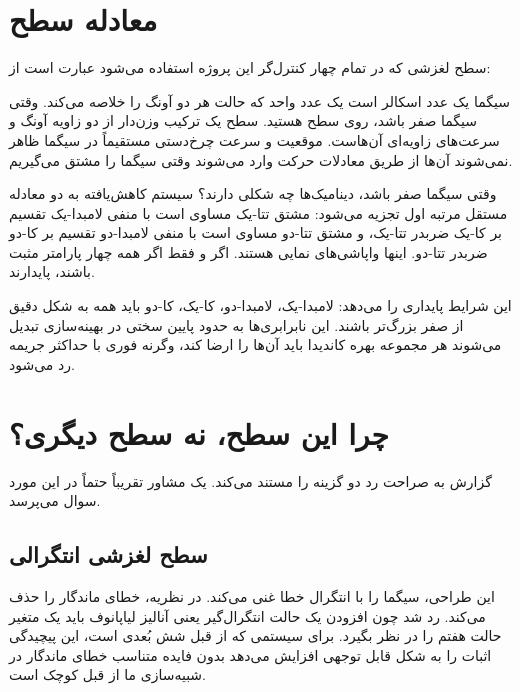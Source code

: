 \documentclass[12pt, a4paper]{article}
\newcommand{\dash}{\lr{---}}
\begin{document}
\section{معادله سطح}

سطح لغزشی که در تمام چهار کنترل‌گر اين پروژه استفاده می‌شود عبارت است از:

\begin{center}
\mbox{}
\end{center}

سيگما يک عدد اسکالر است \dash{} يک عدد واحد که حالت هر دو آونگ را خلاصه می‌کند. وقتی سيگما صفر باشد، روی سطح هستيد. سطح يک ترکيب وزن‌دار از دو زاويه آونگ و سرعت‌های زاويه‌ای آن‌هاست. موقعيت و سرعت چرخ‌دستی مستقيماً در سيگما ظاهر نمی‌شوند \dash{} آن‌ها از طريق معادلات حرکت وارد می‌شوند وقتی سيگما را مشتق می‌گيريم.

وقتی سيگما صفر باشد، ديناميک‌ها چه شکلی دارند؟ سيستم کاهش‌يافته به دو معادله مستقل مرتبه اول تجزيه می‌شود: مشتق تتا-يک مساوی است با منفی لامبدا-يک تقسيم بر کا-يک ضربدر تتا-يک، و مشتق تتا-دو مساوی است با منفی لامبدا-دو تقسيم بر کا-دو ضربدر تتا-دو. اينها واپاشی‌های نمايی هستند. اگر و فقط اگر همه چهار پارامتر مثبت باشند، پايدارند.

اين شرايط پايداری را می‌دهد: لامبدا-يک، لامبدا-دو، کا-يک، کا-دو بايد همه به شکل دقيق از صفر بزرگ‌تر باشند. اين نابرابری‌ها به حدود پايين سختی در بهينه‌سازی تبديل می‌شوند \dash{} هر مجموعه بهره کانديدا بايد آن‌ها را ارضا کند، وگرنه فوری با حداکثر جريمه رد می‌شود.

\section{چرا اين سطح، نه سطح ديگری؟}

گزارش به صراحت رد دو گزينه را مستند می‌کند. يک مشاور تقريباً حتماً در اين مورد سوال می‌پرسد.

\subsection{سطح لغزشی انتگرالی}

اين طراحی، سيگما را با انتگرال خطا غنی می‌کند. در نظريه، خطای ماندگار را حذف می‌کند. رد شد چون افزودن يک حالت انتگرال‌گير يعنی آناليز لياپانوف بايد يک متغير حالت هفتم را در نظر بگيرد. برای سيستمی که از قبل شش بُعدی است، اين پيچيدگی اثبات را به شکل قابل توجهی افزايش می‌دهد بدون فايده متناسب \dash{} خطای ماندگار در شبيه‌سازی ما از قبل کوچک است.
\end{document}
